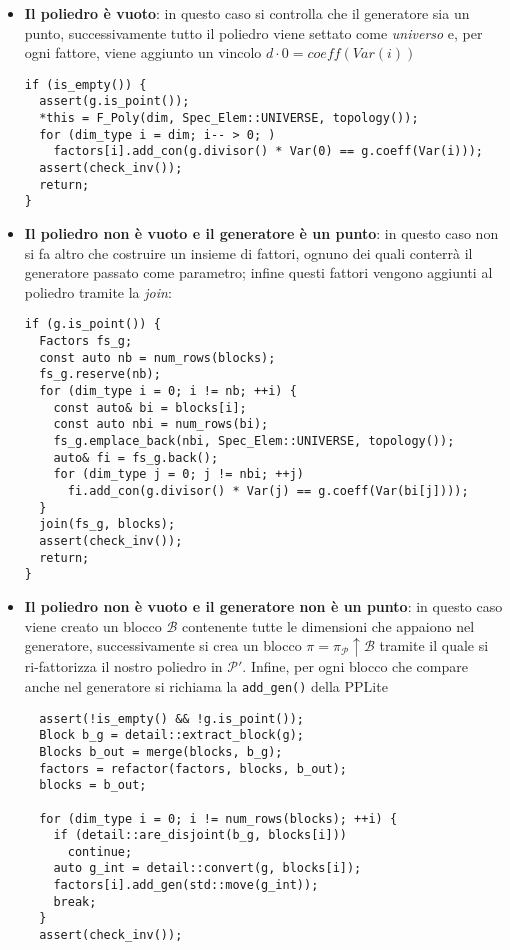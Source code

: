 \documentclass{mimosis}
\theoremstyle{definition}
\begin{document}
\begin{itemize}
\item \textbf{Il poliedro è vuoto}: in questo caso si controlla che il generatore sia un
punto, successivamente tutto il poliedro viene settato come \emph{universo} e, per
ogni fattore, viene aggiunto un vincolo \(d \cdot 0 = coeff(Var(i))\)
\lstset{style=mystyle,language=C++,label= ,caption= ,captionpos=b,numbers=none}
\begin{lstlisting}
if (is_empty()) {
  assert(g.is_point());
  *this = F_Poly(dim, Spec_Elem::UNIVERSE, topology());
  for (dim_type i = dim; i-- > 0; )
    factors[i].add_con(g.divisor() * Var(0) == g.coeff(Var(i)));
  assert(check_inv());
  return;
}
\end{lstlisting}
\item \textbf{Il poliedro non è vuoto e il generatore è un punto}: in questo caso non si fa
altro che costruire un insieme di fattori, ognuno dei quali conterrà il
generatore passato come parametro; infine questi fattori vengono aggiunti al
poliedro tramite la \emph{join}:
\lstset{style=mystyle,language=C++,label= ,caption= ,captionpos=b,numbers=none}
\begin{lstlisting}
if (g.is_point()) {
  Factors fs_g;
  const auto nb = num_rows(blocks);
  fs_g.reserve(nb);
  for (dim_type i = 0; i != nb; ++i) {
    const auto& bi = blocks[i];
    const auto nbi = num_rows(bi);
    fs_g.emplace_back(nbi, Spec_Elem::UNIVERSE, topology());
    auto& fi = fs_g.back();
    for (dim_type j = 0; j != nbi; ++j)
      fi.add_con(g.divisor() * Var(j) == g.coeff(Var(bi[j])));
  }
  join(fs_g, blocks);
  assert(check_inv());
  return;
}
\end{lstlisting}
\item \textbf{Il poliedro non è vuoto e il generatore non è un punto}: in questo caso viene
creato un blocco \(\mathcal{B}\) contenente tutte le dimensioni che appaiono
nel generatore, successivamente si crea un blocco \(\pi =
  \pi_{\mathcal{P}} \uparrow \mathcal{B}\) tramite il quale si ri-fattorizza il
nostro poliedro in \(\mathcal{P}'\). Infine, per ogni blocco che compare anche
nel generatore si richiama la \texttt{add\_gen()} della PPLite
\lstset{style=mystyle,language=C++,label= ,caption= ,captionpos=b,numbers=none}
\begin{lstlisting}
  assert(!is_empty() && !g.is_point());
  Block b_g = detail::extract_block(g);
  Blocks b_out = merge(blocks, b_g);
  factors = refactor(factors, blocks, b_out);
  blocks = b_out;

  for (dim_type i = 0; i != num_rows(blocks); ++i) {
    if (detail::are_disjoint(b_g, blocks[i]))
      continue;
    auto g_int = detail::convert(g, blocks[i]);
    factors[i].add_gen(std::move(g_int));
    break;
  }
  assert(check_inv());
\end{lstlisting}
\end{itemize}
\end{document}

